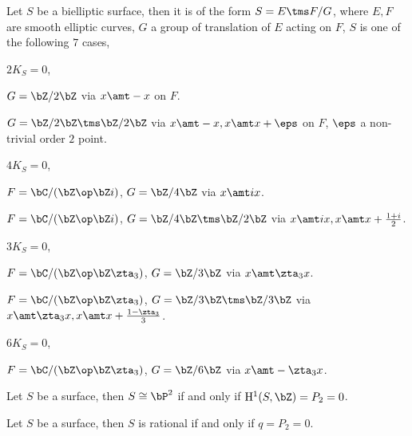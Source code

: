 \documentclass[a4paper, twoside]{article}
\begin{document}
\begin{thm}
	Let $S$ be a bielliptic surface, then it is of the form $S=E\tms F/G$, where $E,F$ are smooth elliptic curves, $G$ a group of translation of $E$ acting on $F$, $S$ is one of the following $7$ cases,
	\begin{enr}
		\item $2K_{S}=0$,
		\begin{itm}
			\item $G=\bZ/2\bZ$ via $x\amt-x$ on $F$.
			\item $G=\bZ/2\bZ\tms\bZ/2\bZ$ via $x\amt-x, x\amt x+\eps$ on $F$, $\eps$ a non-trivial order $2$ point.
		\end{itm}
		\item $4K_{S}=0$,
		\begin{itm}
			\item $F=\bC/(\bZ\op\bZ i)$, $G=\bZ/4\bZ$ via $x\amt ix$.
			\item $F=\bC/(\bZ\op\bZ i)$, $G=\bZ/4\bZ\tms\bZ/2\bZ$ via $x\amt ix, x\amt x+\frac{1+i}{2}$.
		\end{itm}
		\item $3K_{S}=0$,
		\begin{itm}
			\item $F=\bC/(\bZ\op\bZ\zta_{3})$, $G=\bZ/3\bZ$ via $x\amt \zta_{3}x$.
			\item $F=\bC/(\bZ\op\bZ\zta_{3})$, $G=\bZ/3\bZ\tms\bZ/3\bZ$ via $x\amt \zta_{3}x, x\amt x+\frac{1-\zta_{3}}{3}$.
		\end{itm}
		\item $6K_{S}=0$,
		\begin{itm}
			\item $F=\bC/(\bZ\op\bZ\zta_{3})$, $G=\bZ/6\bZ$ via $x\amt -\zta_{3}x$.
		\end{itm}
	\end{enr}
\end{thm}




\begin{thm}
	Let $S$ be a surface, then $S\cong\bP^{2}$ if and only if  $\mathrm{H}_{}^{1}(S,\bZ)=P_{2}=0$.
\end{thm}

\begin{thm}
	Let $S$ be a surface, then $S$ is rational if and only if $q=P_{2}=0$.
\end{thm}
\end{document}
